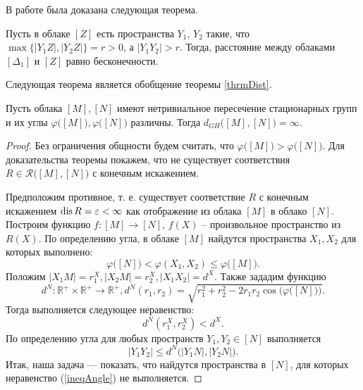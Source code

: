 В работе была доказана следующая теорема.
\begin{theorem}
  Пусть в облаке \( [Z] \) есть пространства $Y_{1}$, $
  Y_{2}$ такие, что \\$\max\big\{ |Y_{1}Z|, |Y_{2} Z| \big\} = r>0$, а
  $|Y_{1} Y_{2}|>r$. Тогда, расстояние между облаками $[\Delta_1]$ и $[Z]$
  равно бесконечности. \label{thrmDist}
\end{theorem}
Следующая теорема является обобщение теоремы \ref{thrmDist}.
\begin{theorem}
  Пусть облака \( [M], [N] \) имеют нетривиальное пересечение
  стационарных групп и их углы \( \varphi \big([M]\big), \varphi
  \big([N]\big) \) различны. Тогда \( d_{GH} \big([M], [N]\big) = \infty \).
\end{theorem}
\begin{proof}
  Без ограничения общности будем считать, что \( \varphi
  \big([M]\big)> \varphi \big([N]\big) \). Для доказательства теоремы
  покажем, что не существует соответствия \( R\in
  \mathcal{R}\big([M],[N]\big) \) с конечным искажением.

  Предположим противное, т. е. существует соответствие \( R \) с
  конечным искажением \( \operatorname{dis} R = \varepsilon
  < \infty \) как отображение из облака \( [M] \) в облако \( [N] \).
  Построим функцию \( f \colon [M] \rightarrow [N] \), \( f(X) \) --
  произвольное пространство из \( R(X) \).
  По определению угла, в облаке \( [M] \) найдутся пространства \(
  X_1, X_2 \) для которых выполнено:
  \[
    \varphi \big([N]\big) < \varphi (X_1, X_2) \le \varphi \big([M]\big).
  \]
  Положим \( |X_1 M| = r_1^X,  |X_2 M| = r_2^X, | X_1 X_2 | =
  d^X\). Также зададим функцию
  \[
    d^N \colon \mathbb{R}^+ \times
    \mathbb{R}^+ \rightarrow \mathbb{R}^+, d^N(r_1, r_2) =
    \sqrt{r_1^2 + r_2^2 - 2r_1r_2\cos\Big(\varphi \big([N]\big)\Big)}.
  \]
  Тогда выполняется следующее неравенство:
  \[
    d^N(r_1^X, r_2^X) < d^X.
  \]
  По определению угла для любых пространств \( Y_1, Y_2 \in [N] \) выполняется
  \begin{equation}
    | Y_1 Y_2 | \le d^N\big(| Y_1N |, | Y_2N |\big).
    \label{ineqAngle}
  \end{equation}
  Итак, наша задача --- показать, что найдутся пространства в \( [N] \),
  для которых неравенство (\ref{ineqAngle}) не выполняется.


\end{proof}
